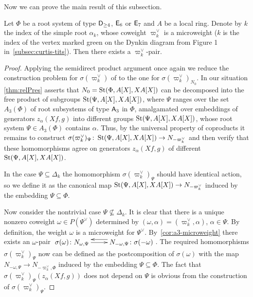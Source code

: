 Now we can prove the main result of this subsection.
\begin{thm} \label{thm:pairconstr}
    Let $\Phi$ be a root system of type $\mathsf{D}_{\geq 4}$, $\mathsf{E}_6$ or $\mathsf{E}_7$ and $A$ be a local ring.
    Denote by $k$ the index of the simple root $\alpha_k$, whose coweight $\varpi_k^\vee$ is a microweight
     ($k$ is the index of the vertex marked green on the Dynkin diagram from Figure 1 in~\cref{subsec:curtis-tits}).
    Then there exists a $\varpi_k^\vee$-pair.
\end{thm}
\begin{proof}
    Applying the semidirect product argument once again we reduce the construction problem for $\sigma(\varpi_k^\vee)$ of to the one for $\sigma({\varpi_k^\vee})_{N_0}$.
    In our situation \cref{thm:relPres} asserts that $N_0 = \operatorname{St}(\Phi, A[X], XA[X])$ can be decomposed into the free product of subgroups $\operatorname{St}(\Psi, A[X], XA[X])$,
    where $\Psi$ ranges over the set $A_3(\Phi)$ of root subsystems of type $\mathsf{A}_3$ in $\Phi$, amalgamated over embeddings of generators $z_\alpha(Xf, g)$ into different groups $\operatorname{St}(\Psi, A[X], XA[X])$, whose root system $\Psi \in A_3(\Phi)$ contains $\alpha$.
    Thus, by the universal property of coproducts it remains to construct $\sigma(\varpi_k^\vee)_\Psi \colon \operatorname{St}(\Psi, A[X], XA[X]) \to N_{-\varpi_k^\vee}$ and then
    verify that these homomorphisms agree on generators $z_\alpha(Xf, g)$ of different $\operatorname{St}(\Psi, A[X], XA[X])$.

    In the case $\Psi \subseteq \Delta_k$ the homomorphism $\sigma(\varpi_k^\vee)_\Psi$ should have identical action, so we define it as the canonical map $\operatorname{St}(\Psi, A[X], XA[X]) \to N_{-\varpi_k^\vee}$
    induced by the embedding $\Psi \subseteq \Phi$.

    Now consider the nontrivial case $\Psi \not\subseteq \Delta_k$.
    It is clear that there is a unique nonzero coweight $\omega \in P(\Psi^\vee)$ determined by $(\omega, \alpha) = (\varpi_k^\vee, \alpha)$, $\alpha \in \Psi$.
    By definition, the weight $\omega$ is a microweight for $\Psi^\vee$.
    By~\cref{cor:a3-microweight} there exists an $\omega$-pair $\xymatrix{ \sigma(\omega)\colon N_{\omega, \Psi} \ar[r] & \ar@<-1.0ex>[l] N_{-\omega, \Psi}\colon \sigma(-\omega) }$.
    The required homomorphisms $\sigma(\varpi_k^\vee)_\Psi$ now can be defined as the postcomposition of $\sigma(\omega)$ with the map $N_{-\omega, \Psi} \to N_{-\varpi_k^\vee, \Phi}$ induced by the embedding $\Psi \subseteq \Phi$.
    The fact that $\sigma(\varpi_k^\vee)_\Psi(z_\alpha(Xf, g))$ does not depend on $\Psi$ is obvious from the construction of $\sigma(\varpi_k^\vee)_\Psi$.
\end{proof}